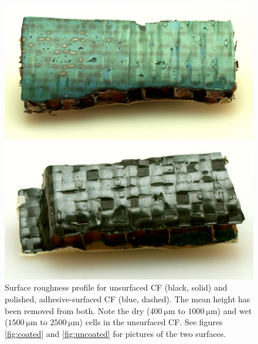 \documentclass{aiaa-tc}%
\begin{document}
\begin{figure}[t]
	\centering
	\parbox{0.45\linewidth}
	{
		\centering
		\includegraphics[width=\linewidth]{../img/coated.JPG}	
		\caption{A sandwich plate sample which has been coated with structural adhesive. The left side has been sanded and polished. See figure \ref{fig:roughness} for a plot of the surface profile.}
		\label{fig:coated}
	}
	\hfill
	\parbox{0.45\linewidth}
	{
		\centering
		\includegraphics[width=\linewidth]{../img/uncoated.JPG}	
		\caption{A sandwich plate sample which has \emph{not} been coated with structural adhesive. See figure \ref{fig:roughness} for a plot of the surface profile. Note the dry cells where the epoxy has not wetted the CF.}
		\label{fig:uncoated}
	}
	\parbox{4in}
	{
		\centering
		
			\caption{Surface roughness profile for unsurfaced CF (black, solid) and polished, adhesive-surfaced CF (blue, dashed). The mean height has been removed from both. Note the dry ($\SI{400}{\micro\meter}$ to $\SI{1000}{\micro\meter}$) and wet ($\SI{1500}{\micro\meter}$ to $\SI{2500}{\micro\meter}$) cells in the unsurfaced CF. See figures \ref{fig:coated}  and \ref{fig:uncoated} for pictures of the two surfaces.}
		\label{fig:roughness}
	}
\end{figure}
\end{document}
